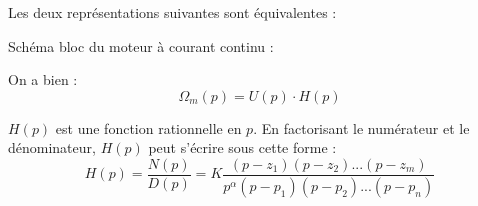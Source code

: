 \documentclass[10pt,fleqn]{article} %
\begin{document}
\begin{rem}
Les deux représentations suivantes sont équivalentes :

\begin{minipage}[c]{.45\linewidth}
\begin{center}
\end{center}
\end{minipage}\hfill
\begin{minipage}[c]{.45\linewidth}
\begin{center}
\end{center}
\end{minipage}

\end{rem}

\begin{exemple}
Schéma bloc du moteur à courant continu :
\begin{center}

On a bien :
$$
\Omega_m(p) = U(p) \cdot H(p)
$$
\end{center}

\end{exemple}





$H(p)$ est une fonction rationnelle en $p$. En factorisant le numérateur et le
dénominateur, $H(p)$ peut s'écrire sous cette forme :
$$
H(p) = \dfrac{N(p)}{D(p)} =
K \dfrac{\left(p-z_1 \right)\left(p-z_2 \right)...\left(p-z_m \right)}{
p^{\alpha} \left(p-p_1 \right)\left(p-p_2 \right)...\left(p-p_n \right)}
$$
\end{document}
